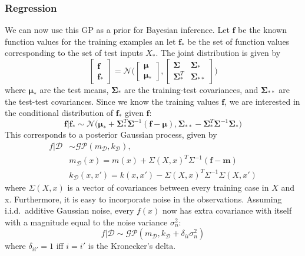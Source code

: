 \documentclass{article}
\begin{document}
\subsubsection{Regression}
We can now use this GP as a prior for Bayesian inference. Let $\mathbf{f}$ be the known function values for the training examples an let $\mathbf{f}_*$ be the set of function values corresponding to the set of test inputs $X_*$. The joint distribution is given by
\begin{equation*}
\begin{bmatrix} \mathbf{f} \\ \mathbf{f}_* \end{bmatrix} 
= 
\mathcal{N}\Big(\begin{bmatrix} \mathbf{\mu} \\ \mathbf{\mu}_* \end{bmatrix}, \begin{bmatrix}\mathbf{\Sigma} & \mathbf{\Sigma}_* \\ \mathbf{\Sigma}_*^T & \mathbf{\Sigma}_{**} \end{bmatrix} \Big)
\end{equation*}
where $\mathbf{\mu}_*$ are the test means, $\mathbf{\Sigma}_*$ are the training-test covariances, and $\mathbf{\Sigma}_{**}$ are the test-test covariances. Since we know the training values $\mathbf{f}$, we are interested in the conditional distribution of $\mathbf{f}_*$ given $\mathbf{f}$:
\begin{equation*}
	\mathbf{f} \big\vert \mathbf{f}_* \sim
	\mathcal{N} \big( \mathbf{\mu}_* + \mathbf{\Sigma}_*^T \mathbf{\Sigma}^{-1}(\mathbf{f}-\mathbf{\mu}), \mathbf{\Sigma}_{**} - \mathbf{\Sigma}^T_*\mathbf{\Sigma}^{-1}\mathbf{\Sigma}_* \big)
\end{equation*}
This corresponds to a posterior Gaussian process, given by
\begin{align*}
	f \big\vert \mathcal{D} &\sim \mathcal{GP}(m_\mathcal{D}, k_\mathcal{D}), \\
	& m_\mathcal{D}(x) = m(x) + \Sigma(X,x)^T\Sigma^{-1}(\mathbf{f}-\mathbf{m})\\
	& k_\mathcal{D}(x, x') = k(x, x') - \Sigma(X,x)^T\Sigma^{-1}\Sigma(X, x')
\end{align*}
where $\Sigma(X, x)$ is a vector of covariances between every training case in $X$ and x. Furthermore, it is easy to incorporate noise in the observations. Assuming i.i.d.\ additive Gaussian noise, every $f(x)$ now has extra covariance with itself with a magnitude equal to the noise variance $\sigma_n^2$:
\begin{equation*}
	f \big\vert \mathcal{D} \sim \mathcal{GP}(m_\mathcal{D}, k_\mathcal{D} + \delta_{ii} \sigma_n^2)
\end{equation*}
where $\delta_{ii'} = 1$ iff $i=i'$ is the Kronecker's delta.
\end{document}
